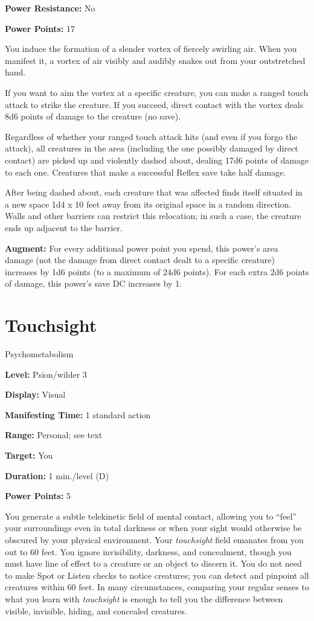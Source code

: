 \documentclass{article}
\begin{document}
\textbf{Power Resistance:} No

\textbf{Power Points:} 17

You induce the formation of a slender vortex of fiercely swirling air. When you 
manifest it, a vortex of air visibly and audibly snakes out from your outstretched 
hand.

If you want to aim the vortex at a specific creature, you can make a ranged touch 
attack to strike the creature. If you succeed, direct contact with the vortex deals 
8d6 points of damage to the creature (no save).

Regardless of whether your ranged touch attack hits (and even if you forgo the 
attack), all creatures in the area (including the one possibly damaged by direct 
contact) are picked up and violently dashed about, dealing 17d6 points of damage 
to each one. Creatures that make a successful Reflex save take half damage.

After being dashed about, each creature that was affected finds itself situated 
in a new space 1d4 x 10 feet away from its original space in a random direction. 
Walls and other barriers can restrict this relocation; in such a case, the creature 
ends up adjacent to the barrier.

\textbf{Augment:} For every additional power point you spend, this power's area 
damage (not the damage from direct contact dealt to a specific creature) increases 
by 1d6 points (to a maximum of 24d6 points). For each extra 2d6 points of damage, 
this power's save DC increases by 1.

\vspace{12pt}
\section*{Touchsight}

Psychometabolism

\textbf{Level:} Psion/wilder 3

\textbf{Display:} Visual

\textbf{Manifesting Time:} 1 standard action

\textbf{Range:} Personal; see text

\textbf{Target:} You

\textbf{Duration:} 1 min./level (D)

\textbf{Power Points:} 5

You generate a subtle telekinetic field of mental contact, allowing you to ``feel'' 
your surroundings even in total darkness or when your sight would otherwise be 
obscured by your physical environment. Your \textit{touchsight }field emanates 
from you out to 60 feet. You ignore invisibility, darkness, and concealment, though 
you must have line of effect to a creature or an object to discern it. You do not 
need to make Spot or Listen checks to notice creatures; you can detect and pinpoint 
all creatures within 60 feet. In many circumstances, comparing your regular senses 
to what you learn with \textit{touchsight }is enough to tell you the difference 
between visible, invisible, hiding, and concealed creatures.
\end{document}
